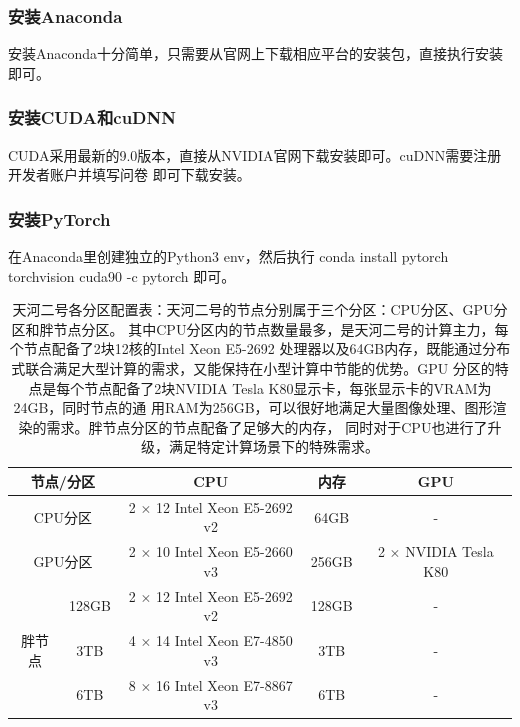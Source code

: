 \subsubsection{安装Anaconda}

安装Anaconda十分简单，只需要从官网上下载相应平台的安装包，直接执行安装即可。

\subsubsection{安装CUDA和cuDNN}

CUDA采用最新的9.0版本，直接从NVIDIA官网下载安装即可。cuDNN需要注册开发者账户并填写问卷
即可下载安装。

\subsubsection{安装PyTorch}

在Anaconda里创建独立的Python3 env，然后执行
conda install pytorch torchvision cuda90 -c pytorch 即可。

\begin{table}[]
\centering
\caption{天河二号各分区配置表：天河二号的节点分别属于三个分区：CPU分区、GPU分区和胖节点分区。
其中CPU分区内的节点数量最多，是天河二号的计算主力，每个节点配备了2块12核的Intel Xeon E5-2692
处理器以及64GB内存，既能通过分布式联合满足大型计算的需求，又能保持在小型计算中节能的优势。GPU
分区的特点是每个节点配备了2块NVIDIA Tesla K80显示卡，每张显示卡的VRAM为24GB，同时节点的通
用RAM为256GB，可以很好地满足大量图像处理、图形渲染的需求。胖节点分区的节点配备了足够大的内存，
同时对于CPU也进行了升级，满足特定计算场景下的特殊需求。}

\label{tab:tianheconfig}
\begin{tabular}{|c|c|c|c|c|}
\hline
\multicolumn{2}{|c|}{节点/分区}  & CPU                          & 内存    & GPU                  \\ \hline
\multicolumn{2}{|c|}{CPU分区}  & 2 $\times$ 12 Intel Xeon E5-2692 v2 & 64GB  & -                    \\ \hline
\multicolumn{2}{|c|}{GPU分区}  & 2 $\times$ 10 Intel Xeon E5-2660 v3 & 256GB & 2 $\times$ NVIDIA Tesla K80 \\ \hline
\multirow{3}{*}{胖节点} & 128GB & 2 $\times$ 12 Intel Xeon E5-2692 v2 & 128GB & -                    \\ \cline{2-5}
                     & 3TB   & 4 $\times$ 14 Intel Xeon E7-4850 v3 & 3TB   & -                    \\ \cline{2-5}
                     & 6TB   & 8 $\times$ 16 Intel Xeon E7-8867 v3 & 6TB   & -                    \\ \hline
\end{tabular}
\end{table}

